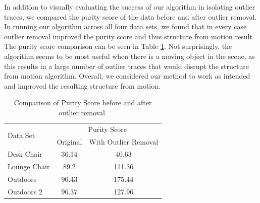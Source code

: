 In addition to visually evaluating the success of our algorithm in isolating
outlier traces, we compared the purity score of the data before and after
outlier removal.  In running our algorithm across all four data
sets, we found that in every case outlier removal improved the purity score and
thus structure from motion result.  The purity score comparison can be seen in
Table \ref{tab:purities}.  Not surprisingly, the algorithm seems to be most
useful when there is a moving object in the scene, as this results in a large
number of outlier traces that would disrupt the structure from motion
algorithm.  Overall, we considered our method to work as intended and improved
the resulting structure from motion.

\begin{table}[tb]
	\begin{center}
		\begin{tabular}{|l|c|c|}
			\hline
			\multirow{2}{*}{Data Set}  &\multicolumn{2}{|c|}{Purity Score}\\ \cline{2-3}
			& \multicolumn{1}{|c|}{Original}  & \multicolumn{1}{|c|}{With Outlier Removal}\\ \hline
			Desk Chair & 36.14 & 40.63 \\ \hline
			Lounge Chair & 89.2 & 111.36 \\ \hline
			Outdoors & 90.43 & 175.44 \\ \hline
			Outdoors 2 & 96.37 & 127.96 \\ \hline
		\end{tabular}
	\end{center}
	\caption{Comparison of Purity Score before and after outlier removal.}
	\label{tab:purities}
\end{table}


